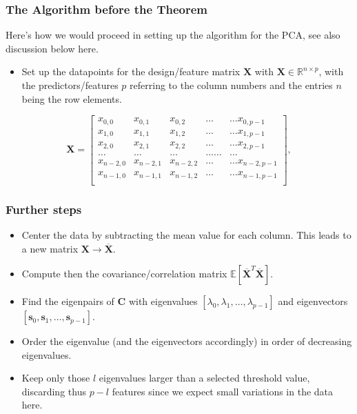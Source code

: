 \documentclass{beamer}
\begin{document}
\begin{frame}
\frametitle{The Algorithm before the Theorem}

Here's how we would proceed in setting up the algorithm for the PCA, see also discussion below here. 
\begin{itemize}
\item Set up the datapoints for the design/feature matrix $\bm{X}$ with $\bm{X}\in {\mathbb{R}}^{n\times p}$, with the predictors/features $p$  referring to the column numbers and the entries $n$ being the row elements.
\end{itemize}

\noindent
\[
\bm{X}=\begin{bmatrix}
x_{0,0} & x_{0,1} & x_{0,2}& \dots & \dots x_{0,p-1}\\
x_{1,0} & x_{1,1} & x_{1,2}& \dots & \dots x_{1,p-1}\\
x_{2,0} & x_{2,1} & x_{2,2}& \dots & \dots x_{2,p-1}\\
\dots & \dots & \dots & \dots \dots & \dots \\
x_{n-2,0} & x_{n-2,1} & x_{n-2,2}& \dots & \dots x_{n-2,p-1}\\
x_{n-1,0} & x_{n-1,1} & x_{n-1,2}& \dots & \dots x_{n-1,p-1}\\
\end{bmatrix},
\]
\end{frame}

\begin{frame}
\frametitle{Further steps}

\begin{itemize}
\item Center the data by subtracting the mean value for each column. This leads to a new matrix $\bm{X}\rightarrow \overline{\bm{X}}$.

\item Compute then the covariance/correlation matrix $\mathbb{E}[\overline{\bm{X}}^T\overline{\bm{X}}]$.

\item Find the eigenpairs of $\bm{C}$ with eigenvalues $[\lambda_0,\lambda_1,\dots,\lambda_{p-1}]$ and eigenvectors $[\bm{s}_0,\bm{s}_1,\dots,\bm{s}_{p-1}]$.

\item Order the eigenvalue (and the eigenvectors accordingly) in order of decreasing eigenvalues.

\item Keep only those $l$ eigenvalues larger than a selected threshold value, discarding thus $p-l$ features since we expect small variations in the data here.
\end{itemize}

\noindent
\end{frame}
\end{document}
